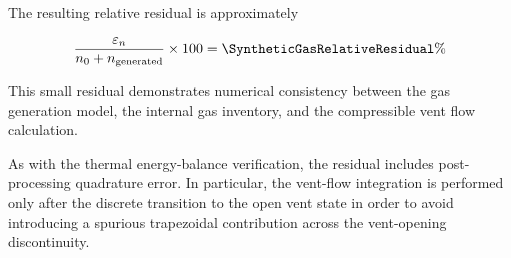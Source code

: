 

The resulting relative residual is approximately

\begin{equation}
    \frac{\varepsilon_n}
    {n_0+n_{\mathrm{generated}}}
    \times 100
    =
    \SyntheticGasRelativeResidual\%
\end{equation}

This small residual demonstrates numerical consistency between the gas
generation model, the internal gas inventory, and the compressible vent
flow calculation.

As with the thermal energy-balance verification, the residual includes
post-processing quadrature error. In particular, the vent-flow
integration is performed only after the discrete transition to the open
vent state in order to avoid introducing a spurious trapezoidal
contribution across the vent-opening discontinuity.